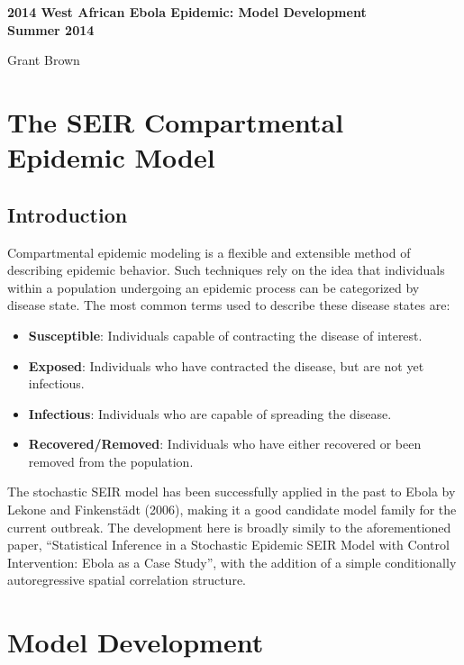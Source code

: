 \documentclass[12pt]{article}
\newcommand \noi {\noindent}
\begin{document}
\begin{center}    
    \noi \bf 2014 West African Ebola Epidemic: Model Development\\ 
    \vspace{.05in}
    \noi Summer 2014\\
    \vspace{.05in}

    \vspace{.15in}
    \noi Grant Brown\\ 

\end{center}
\section{The SEIR Compartmental Epidemic Model}
\subsection{Introduction}
Compartmental epidemic modeling is a flexible and extensible method of describing epidemic behavior.  
Such techniques rely on the idea that individuals within a population undergoing an epidemic process 
can be categorized by disease state. The most common terms used to describe these disease states are: \\ 

\begin{itemize}
    \item {\bf{Susceptible}}: Individuals capable of contracting the disease of interest. 
    \item {\bf{Exposed}}: Individuals who have contracted the disease, but are not yet infectious. 
    \item {\bf{Infectious}}: Individuals who are capable of spreading the disease.  
    \item {\bf{Recovered/Removed}}: Individuals who have either recovered or been removed from the population. 
\end{itemize}

The stochastic SEIR model has been successfully applied in the past to Ebola by Lekone and Finkenst{\"a}dt (2006), 
making it a good candidate model family for the current outbreak. The development here is broadly simily to the 
aforementioned paper, ``Statistical Inference in a Stochastic Epidemic SEIR Model with Control Intervention: Ebola 
as a Case Study'', with the addition of a simple conditionally autoregressive spatial correlation structure. 

\section{Model Development}
\end{document}
